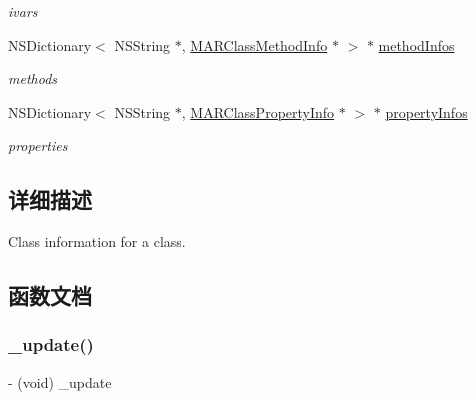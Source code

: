 \begin{DoxyCompactItemize}
\begin{DoxyCompactList}\small\item\em ivars \end{DoxyCompactList}\item 
N\+S\+Dictionary$<$ N\+S\+String $\ast$, \hyperlink{interface_m_a_r_class_method_info}{M\+A\+R\+Class\+Method\+Info} $\ast$ $>$ $\ast$ \hyperlink{interface_m_a_r_class_info_abe274071733498a06945d06e553db415}{method\+Infos}
\begin{DoxyCompactList}\small\item\em methods \end{DoxyCompactList}\item 
N\+S\+Dictionary$<$ N\+S\+String $\ast$, \hyperlink{interface_m_a_r_class_property_info}{M\+A\+R\+Class\+Property\+Info} $\ast$ $>$ $\ast$ \hyperlink{interface_m_a_r_class_info_ad6eea0f70236be40b9f8fc620b25c7cb}{property\+Infos}
\begin{DoxyCompactList}\small\item\em properties \end{DoxyCompactList}\end{DoxyCompactItemize}


\subsection{详细描述}
Class information for a class. 

\subsection{函数文档}
\mbox{\label{interface_m_a_r_class_info_afaa3830de4c083c8535e37938dc3f025}} 
\subsubsection{\texorpdfstring{\+\_\+update()}{\_update()}}
{\footnotesize\ttfamily -\/ (void) \+\_\+update \begin{DoxyParamCaption}{ }\end{DoxyParamCaption}\hspace{0.3cm}{\ttfamily [implementation]}}

\mbox{\label{interface_m_a_r_class_info_acff0082c25a0ba994f9f9dc7b9642523}} 
